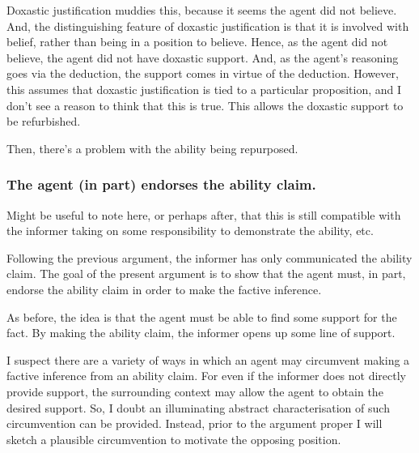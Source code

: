 \documentclass[10pt]{article}
\begin{document}
\begin{note}
  Doxastic justification muddies this, because it seems the agent did not believe.
  And, the distinguishing feature of doxastic justification is that it is involved with belief, rather than being in a position to believe.
  Hence, as the agent did not believe, the agent did not have doxastic support.
  And, as the agent's reasoning goes via the deduction, the support comes in virtue of the deduction.
  However, this assumes that doxastic justification is tied to a particular proposition, and I don't see a reason to think that this is true.
  This allows the doxastic support to be refurbished.

  Then, there's a problem with the ability being repurposed.
\end{note}


\subsubsection{The agent (in part) endorses the ability claim.}
\label{sec:agent-in-part}

\begin{note}[Responsibility]
  Might be useful to note here, or perhaps after, that this is still compatible with the informer taking on some responsibility to demonstrate the ability, etc.
\end{note}

Following the previous argument, the informer has only communicated the ability claim.
The goal of the present argument is to show that the agent must, in part, endorse the ability claim in order to make the factive inference.

As before, the idea is that the agent must be able to find some support for the fact.
By making the ability claim, the informer opens up some line of support.

I suspect there are a variety of ways in which an agent may circumvent making a factive inference from an ability claim.
For even if the informer does not directly provide support, the surrounding context may allow the agent to obtain the desired support.
So, I doubt an illuminating abstract characterisation of such circumvention can be provided.
Instead, prior to the argument proper I will sketch a plausible circumvention to motivate the opposing position.
\end{document}
